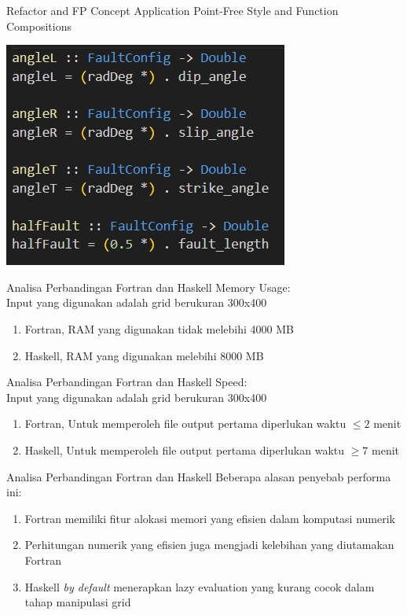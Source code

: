 \documentclass{beamer}
\begin{document}
\begin{frame}{Refactor and FP Concept Application}
    Point-Free Style and Function Compositions
    \begin{center}
        \includegraphics[scale=1.0]{figure/highorder.png}
    \end{center}
\end{frame}

\begin{frame}{Analisa Perbandingan Fortran dan Haskell}
    Memory Usage:\\
    Input yang digunakan adalah grid berukuran 300x400
    \begin{enumerate}
        \item Fortran, RAM yang digunakan tidak melebihi 4000 MB
        \item Haskell, RAM yang digunakan melebihi 8000 MB
    \end{enumerate}
\end{frame}

\begin{frame}{Analisa Perbandingan Fortran dan Haskell}
    Speed:\\
    Input yang digunakan adalah grid berukuran 300x400
    \begin{enumerate}
        \item Fortran, Untuk memperoleh file output pertama diperlukan waktu $\leq 2$ menit
        \item Haskell, Untuk memperoleh file output pertama diperlukan waktu $\geq 7$ menit
    \end{enumerate}
\end{frame}


\begin{frame}{Analisa Perbandingan Fortran dan Haskell}
    Beberapa alasan penyebab performa ini:
    \begin{enumerate}
        \item Fortran memiliki fitur alokasi memori yang efisien dalam komputasi numerik
        \item Perhitungan numerik yang efisien juga mengjadi kelebihan yang diutamakan Fortran
        \item Haskell \textit{by default} menerapkan lazy evaluation yang kurang cocok dalam
        tahap manipulasi grid
    \end{enumerate}
\end{frame}
\end{document}
